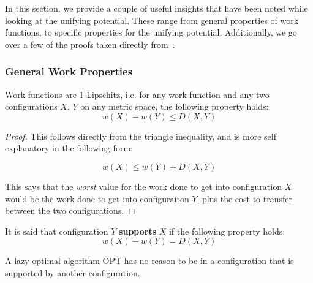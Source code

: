 In this section, we provide a couple of useful insights that have been noted while looking at the unifying potential. These range from general properties of work functions, to specific properties for the unifying potential. Additionally, we go over a few of the proofs taken directly from~\cite{unifyingPotential2021}. 

\subsubsection*{General Work Properties}

\begin{lemma}
    \label{lem:lip}
    Work functions are 1-Lipschitz, i.e. for any work function and any two configurations $X$, $Y$ on any metric space, the following property holds: 
    \begin{equation*}
        w(X) - w(Y) \leq D(X, Y)
    \end{equation*} 
\end{lemma}

\begin{proof}
    This follows directly from the triangle inequality, and is more self explanatory in the following form: 
    
    \begin{equation*}
        w(X) \leq w(Y) + D(X, Y)
    \end{equation*}

    This says that the \textit{worst} value for the work done to get into configuration $X$ would be the work done to get into configuraiton $Y$, plus the cost to transfer between the two configurations.
\end{proof}

\begin{definition}
    It is said that configuration $Y$ \textbf{supports} $X$ if the following property holds:
    \begin{equation*}
        w(X) - w(Y) = D(X,Y)
    \end{equation*}
\end{definition}

\begin{lemma}
    A lazy optimal algorithm $\mathrm{OPT}$ has no reason to be in a configuration that is supported by another configuration.
\end{lemma}

